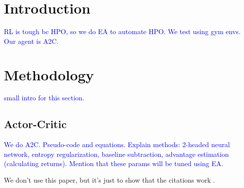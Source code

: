 \documentclass{article}
\newcommand{\TODO}[1]{\textcolor{blue}{#1}}
\begin{document}

\printAffiliationsAndNotice{}

\section{Introduction}
\label{sec:intro}

\TODO{RL is tough bc HPO, so we do EA to automate HPO. We test using gym envs. Our agent is A2C.}

\section{Methodology}
\label{sec:meth}

\TODO{small intro for this section.}

\subsection{Actor-Critic}
\label{ssec:ac}

\TODO{
    We do A2C.
    Pseudo-code and equations.
    Explain methods: 2-headed neural network, entropy regularization, baseline subtraction, advantage estimation (calculating returns).
    Mention that these params will be tuned using EA.
}

We don't use this paper, but it's just to show that the citations work \cite{han2020actorcritic}.
\end{document}
